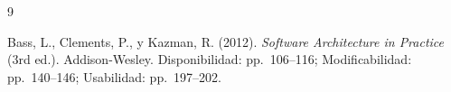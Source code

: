 \renewcommand{\refname}{Referencias}

\begin{thebibliography}{9}

Bass, L., Clements, P., y Kazman, R. (2012).
\textit{Software Architecture in Practice} (3rd ed.).
Addison-Wesley.
Disponibilidad: pp.~106--116; Modificabilidad: pp.~140--146; Usabilidad: pp.~197--202.

\end{thebibliography}

